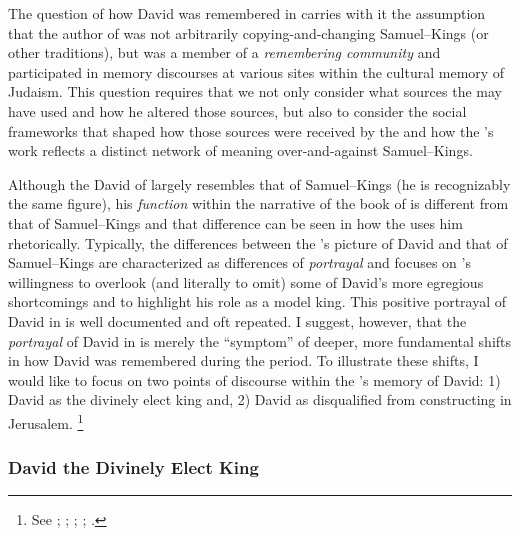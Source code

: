The question of how David was remembered in \chronicles carries with it the assumption that the author of \chronicles was not arbitrarily copying-and-changing Samuel--Kings (or other traditions), but was a member of a \emph{remembering community} and participated in memory discourses at various sites within the cultural memory of \secondtemple Judaism. This question requires that we not only consider what sources the \chronicler may have used and how he altered those sources, but also to consider the social frameworks that shaped how those sources were received by the \chronicler and how the \chronicler's work reflects a distinct network of meaning over-and-against Samuel--Kings.

Although the David of \chronicles largely resembles that of Samuel--Kings (he is recognizably the same figure), his \emph{function} within the narrative of the book of \chronicles is different from that of Samuel--Kings and that difference can be seen in how the \chronicler uses him rhetorically. Typically, the differences between the \chronicler's picture of David and that of Samuel--Kings are characterized as differences of \emph{portrayal} and focuses on \chronicler's willingness to overlook (and literally to omit) some of David's more egregious shortcomings and to highlight his role as a model king. This positive portrayal of David in \chronicles is well documented and oft repeated. I suggest, however, that the \emph{portrayal} of David in \chronicles is merely the ``symptom'' of deeper, more fundamental shifts in how David was remembered during the \secondtemple period. To illustrate these shifts, I would like to focus on two points of discourse within the \chronicler's memory of David: 1) David as the divinely elect king and, 2) David as disqualified from constructing \thetemple in Jerusalem.%
    \footnote{See \cite{jarick_frohlich2019}; \cite[347--383]{japhet2009} \cite{knoppers_biblica1995}; \cite[47--48]{japhet1993}; \cite[44--48]{klein2006}; \cite[80--85]{knoppers2003}.}

\subsubsection{David the Divinely Elect King}

